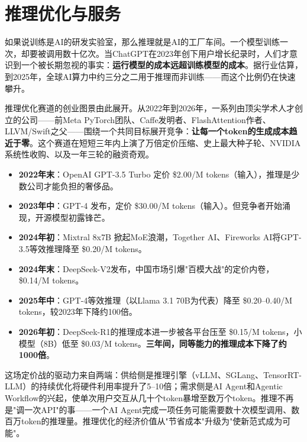 
\section{推理优化与服务}
\label{sec:infra-inference}

如果说训练是AI的研发实验室，那么推理就是AI的工厂车间。一个模型训练一次，却要被调用数十亿次。当ChatGPT在2023年创下用户增长纪录时，人们才意识到一个被长期忽视的事实：\textbf{运行模型的成本远超训练模型的成本}。据行业估算，到2025年，全球AI算力中约三分之二用于推理而非训练——而这个比例仍在快速攀升。

推理优化赛道的创业图景由此展开。从2022年到2026年，一系列由顶尖学术人才创立的公司——前Meta PyTorch团队、Caffe发明者、FlashAttention作者、LLVM/Swift之父——围绕一个共同目标展开竞争：\textbf{让每一个token的生成成本趋近于零}。这个赛道在短短三年内上演了万倍定价压缩、史上最大种子轮、NVIDIA系统性收购、以及一年三轮的融资奇观。

\begin{keybox}
\small
\begin{itemize}[noitemsep]
  \item \textbf{2022年末}：OpenAI GPT-3.5 Turbo 定价 \$2.00/M tokens（输入），推理是少数公司才能负担的奢侈品。
  \item \textbf{2023年中}：GPT-4 发布，定价 \$30.00/M tokens（输入）。但竞争者开始涌现，开源模型初露锋芒。
  \item \textbf{2024年初}：Mixtral 8x7B 掀起MoE浪潮，Together AI、Fireworks AI将GPT-3.5等效推理降至 \$0.20/M tokens。
  \item \textbf{2024年末}：DeepSeek-V2发布，中国市场引爆"百模大战"的定价内卷，\$0.14/M tokens。
  \item \textbf{2025年中}：GPT-4等效推理（以Llama 3.1 70B为代表）降至 \$0.20--0.40/M tokens，较2023年下降约100倍。
  \item \textbf{2026年初}：DeepSeek-R1的推理成本进一步被各平台压至 \$0.15/M tokens，小模型（8B）低至 \$0.03/M tokens。\textbf{三年间，同等能力的推理成本下降了约1000倍}。
\end{itemize}
\end{keybox}

这场定价战的驱动力来自两端：供给侧是推理引擎（vLLM、SGLang、TensorRT-LLM）的持续优化将硬件利用率提升了5--10倍；需求侧是AI Agent和Agentic Workflow的兴起，使单次用户交互从几十个token暴增至数万个token。推理不再是"调一次API"的事——一个AI Agent完成一项任务可能需要数十次模型调用、数百万token的推理量。推理优化的经济价值从"节省成本"升级为"使新范式成为可能"。

